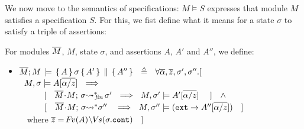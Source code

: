 We now move to the semantics of specifications:   $M \models S$ expresses that  module  $M$   satisfies a specification  $S$.  
{For this, we fist define what it means for a state $\sigma$ to satisfy a triple of assertions:}

{
\begin{definition}
For modules $\overline{M}$, $M$, state $\sigma$, and assertions $A$, $A'$ and  $A''$, we define:
\begin{itemize}
\item
$ {\overline{M}; M\, \models \, \{\, A\,\}\, \sigma \, \{\, A'\,\} \,\parallel\, \{\, A''\,\}  } \ \ \triangleq \ \ \forall \overline{\alpha}, \overline{z}, \sigma',\sigma''.[
$  \\
$\strut \hspace{.2cm} M,  \sigma \models  {A[\overline{\alpha/z}]}  %
  \  \ \Longrightarrow$\\
 $\strut   \ \ \ \  \  \ \ \ \   [ \ \ \  { \overline{M}\!\cdot\! M;\, {\sigma} {\rightsquigarrow^*}\!\!_{\mathit{fin}}\, \sigma' }\ \ \Longrightarrow\ \   M,  \sigma' \models  {A'[\overline{\alpha/z}]}  \ \ \ \  ] \ \ \ \wedge$\\
 $\strut   \ \ \ \  \  \ \ \ \   [ \ \  \ {\overline{M}\!\cdot\! M;\, {\sigma} {\rightsquigarrow^*} \sigma'' }\ \  \ \Longrightarrow\   \   M,  \sigma'' \models  {(\mbox{\normalfont{\texttt{ext}}}\rightarrow A''[\overline{\alpha/z}])} \ \ \  ] $\\
 $\strut \hspace{.2cm}$ where  ${{\overline z= {\hspace{-1pt}F\hspace{-1pt}}v(A)\!\setminus\! {\hspace{-1pt}V\hspace{-1pt}}s(\sigma.\mbox{\normalfont{\texttt{cont}}})}}  \ \ \ ]$ %
\end{itemize} 
\end{definition}
}


